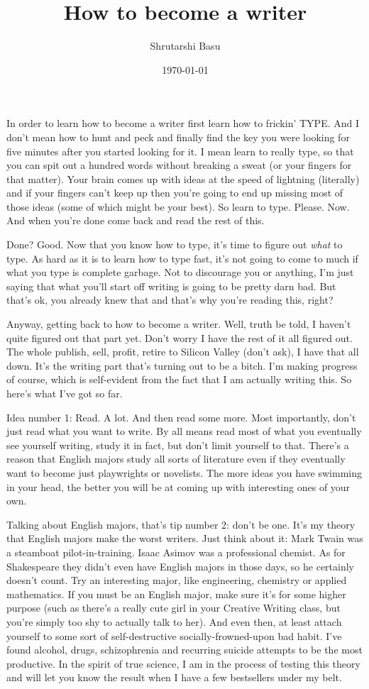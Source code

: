 \documentclass[11pt,letterpaper]{article}
\title{How to become a writer}
\author{Shrutarshi Basu}
\date{\today}
\begin{document}
\maketitle
\doublespacing

In order to learn how to become a writer first learn how to frickin' TYPE. And I don't mean how to hunt and peck and finally find the key you were looking for five minutes after you started looking for it. I mean learn to really type, so that you can spit out a hundred words without breaking a sweat (or your fingers for that matter). Your brain comes up with ideas at the speed of lightning (literally) and if your fingers can't keep up then you're going to end up missing most of those ideas (some of which might be your best). So learn to type. Please. Now. And when you're done come back and read the rest of this.

Done? Good. Now that you know how to type, it's time to figure out \textit{what} to type. As hard as it is to learn how to type fast, it's not going to come to much if what you type is complete garbage. Not to discourage you or anything, I'm just saying that what you'll start off writing is going to be pretty darn bad. But that's ok, you already knew that and that's why you're reading this, right?

Anyway, getting back to how to become a writer. Well, truth be told, I haven't quite figured out that part yet. Don't worry I have the rest of it all figured out. The whole publish, sell, profit, retire to Silicon Valley (don't ask), I have that all down. It's the writing part that's turning out to be a bitch. I'm making progress of course, which is self-evident from the fact that I am actually writing this. So here's what I've got so far. 

Idea number 1: Read. A lot. And then read some more. Most importantly, don't just read what you want to write. By all means read most of what you eventually see yourself writing, study it in fact, but don't limit yourself to that. There's a reason that English majors study all sorts of literature even if they eventually want to become just playwrights or novelists. The more ideas you have swimming in your head, the better you will be at coming up with interesting ones of your own.

Talking about English majors, that's tip number 2: don't be one. It's my theory that English majors make the worst writers. Just think about it: Mark Twain was a steamboat pilot-in-training. Isaac Asimov was a professional chemist. As for Shakespeare they didn't even have English majors in those days, so he certainly doesn't count. Try an interesting major, like engineering, chemistry or applied mathematics. If you must be an English major, make sure it's for some higher purpose (such as there's a really cute girl in your Creative Writing class, but you're simply too shy to actually talk to her). And even then, at least attach yourself to some sort of self-destructive socially-frowned-upon bad habit. I've found alcohol, drugs, schizophrenia and recurring suicide attempts to be the most productive. In the spirit of true science, I am in the process of testing this theory and will let you know the result when I have a few bestsellers under my belt.
\end{document}
